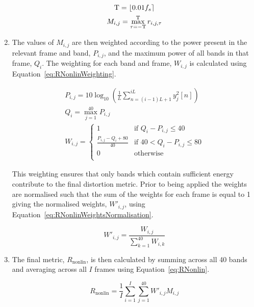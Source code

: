 \begin{enumerate}
					\begin{gather}
						\mathrm{T} = \left\lfloor0.01f_{s}\right\rceil \nonumber \\
						M_{i,j} = \max_{\tau = -\mathrm{T}}^{\mathrm{T}} r_{i,j,\tau}
						\label{eq:RNonlinMaxCrossCorrelation}
					\end{gather}

				\item The values of $M_{i,j}$ are then weighted according to the power present in the
					relevant frame and band, $P_{i,j}$, and the maximum power of all bands in that
					frame, $Q_{i}$. The weighting for each band and frame, $W_{i,j}$ is calculated
					using Equation~\ref{eq:RNonlinWeighting}.

					\begin{gather}
						P_{i,j} = 10\log_{10} \left( \frac{1}{L} 
							\sum_{n=(i-1)L+1}^{iL} y_{j}^{2}[n]\right) \nonumber \\
						Q_{i} = \max_{j = 1}^{40} P_{i,j} \nonumber \\
						W_{i,j} = \begin{cases}
							1 & \text{if $Q_{i} - P_{i,j} \leq 40$} \\
							\frac{P_{i,j} - Q_{i} + 80}{40} & 
								\text{if $40 < Q_{i} - P_{i,j} \leq 80$} \\
							0 & \text{otherwise} \\
						\end{cases}
						\label{eq:RNonlinWeighting}
					\end{gather}

					This weighting ensures that only bands which contain sufficient energy contribute
					to the final distortion metric. Prior to being applied the weights are normalised
					such that the sum of the weights for each frame is equal to 1 giving the normalised
					weights, $W'_{i,j}$, using Equation~\ref{eq:RNonlinWeightsNormalisation}.

					\begin{equation}
						W'_{i,j} = \frac{W_{i, j}}{\sum_{k = 1}^{40} W_{i,k}}
						\label{eq:RNonlinWeightsNormalisation}
					\end{equation}

				\item The final metric, $R_{\mathrm{nonlin}}$, is then calculated by summing across all 40
					bands and averaging across all $I$ frames using Equation~\ref{eq:RNonlin}.

					\begin{equation}
						R_{\mathrm{nonlin}} = \frac{1}{I} \sum_{i = 1}^{I} \sum_{j = 1}^{40} 
									W'_{i,j}M_{i,j}
						\label{eq:RNonlin}
					\end{equation}

			\end{enumerate}

